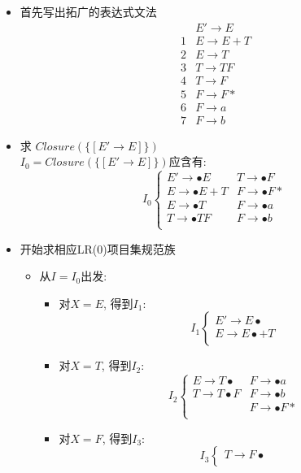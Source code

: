 \documentclass[UTF8]{article}
\newcommand{\blt}{\bullet}
\begin{document}
\begin{itemize}
\item 首先写出拓广的表达式文法
$$\begin{array}{ll}
 & E'\rightarrow E\\
1 & E\rightarrow E+T\\
2 & E\rightarrow T\\
3 & T\rightarrow TF\\
4 & T\rightarrow F\\
5 & F\rightarrow F*\\
6 & F\rightarrow a\\
7 & F\rightarrow b
\end{array}$$
\item 求 $Closure(\{[E'\rightarrow E]\})$\\
$I_0=Closure(\{[E'\rightarrow E]\})$应含有:
$$I_0\left\{\begin{array}{ll}
E'\rightarrow \blt E & T\rightarrow\blt F \\
E\rightarrow \blt E+T & F\rightarrow\blt F* \\
E\rightarrow \blt T & F\rightarrow\blt a \\
T\rightarrow \blt TF & F\rightarrow\blt b \\
\end{array}\right.$$
\item 开始求相应LR(0)项目集规范族\\
	\begin{itemize}
	\item 从$I=I_0$出发:
		\begin{itemize}
		\item 对$X=E$, 得到$I_1$:
		$$I_1\left\{\begin{array}{ll}
		E'\rightarrow E\blt \\
		E\rightarrow E\blt +T \\
		\end{array}\right.$$
		\item 对$X=T$, 得到$I_2$:
		$$I_2\left\{\begin{array}{ll}
		E\rightarrow T\blt & F\rightarrow\blt a \\
		T\rightarrow T\blt F & F\rightarrow\blt b \\
		& F\rightarrow\blt F* \\
		\end{array}\right.$$
		\item 对$X=F$, 得到$I_3$:
		$$I_3\left\{\begin{array}{ll}
		T\rightarrow F\blt\\

\end{array}$$
\end{itemize}
\end{itemize}
\end{itemize}
\end{document}
